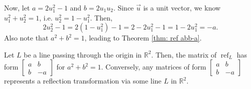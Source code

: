 \documentclass[]{book}
\DeclareMathOperator{\vecref}{ref}
\newcommand{\R}{\ensuremath{\mathbb{R}}}
\begin{document}
Now, let $a=2u_1^2 - 1$ and $b=2u_1u_2$. Since $\vec{u}$ is a unit vector, we know $u_1^2 + u_2^2 = 1$, i.e. $u_2^2 = 1 - u_1^2$. Then,
\[
    2u_2^2 - 1= 2\left(1 - u_1^2\right) - 1 = 2 - 2u_1^2 - 1 = 1 - 2u_1^2 = -a.
\]
Also note that $a^2 + b^2 = 1$, leading to Theorem \ref{thm: ref abb-a}.
\begin{theorem}
    \label{thm: ref abb-a}
    Let $L$ be a line passing through the origin in $\R^2$. Then, the matrix of $\vecref_L$ has form $\begin{bmatrix}a & b \\ b & -a\end{bmatrix}$ for $a^2 + b^2 = 1$. Conversely, any matrices of form $\begin{bmatrix}a & b \\ b & -a\end{bmatrix}$ represents a reflection transformation via some line $L$ in $\R^2$.
\end{theorem}
\end{document}
